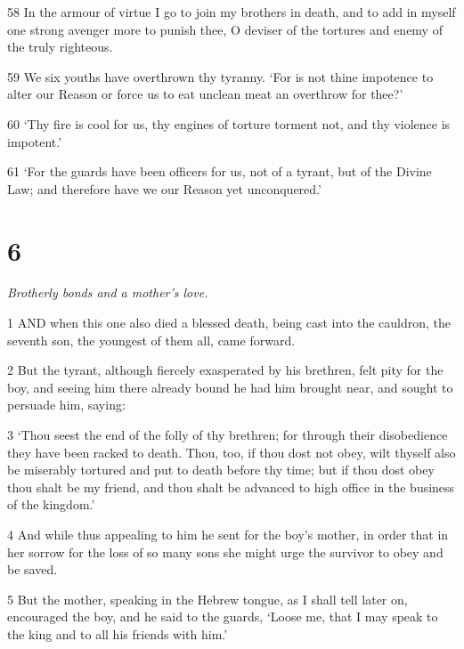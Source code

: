 \par 58 In the armour of virtue I go to join my brothers in death, and to add in myself one strong avenger more to punish thee, O deviser of the tortures and enemy of the truly righteous.

\par 59 We six youths have overthrown thy tyranny. ‘For is not thine impotence to alter our Reason or force us to eat unclean meat an overthrow for thee?’

\par 60 ‘Thy fire is cool for us, thy engines of torture torment not, and thy violence is impotent.’

\par 61 ‘For the guards have been officers for us, not of a tyrant, but of the Divine Law; and therefore have we our Reason yet unconquered.’

\chapter{6}

\par \textit{Brotherly bonds and a mother's love.}

\par 1 AND when this one also died a blessed death, being cast into the cauldron, the seventh son, the youngest of them all, came forward.

\par 2 But the tyrant, although fiercely exasperated by his brethren, felt pity for the boy, and seeing him there already bound he had him brought near, and sought to persuade him, saying: 

\par 3 ‘Thou seest the end of the folly of thy brethren; for through their disobedience they have been racked to death. Thou, too, if thou dost not obey, wilt thyself also be miserably tortured and put to death before thy time; but if thou dost obey thou shalt be my friend, and thou shalt be advanced to high office in the business of the kingdom.’

\par 4 And while thus appealing to him he sent for the boy's mother, in order that in her sorrow for the loss of so many sons she might urge the survivor to obey and be saved.

\par 5 But the mother, speaking in the Hebrew tongue, as I shall tell later on, encouraged the boy, and he said to the guards, ‘Loose me, that I may speak to the king and to all his friends with him.’

